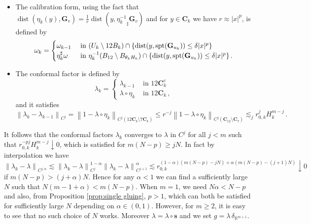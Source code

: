 \documentclass[reqno]{amsart}
\theoremstyle{definition}
\theoremstyle{remark}
\numberwithin{equation}{section}
\newcommand{\norm}[1]{\left\lVert#1\right\rVert}
\newcommand{\R}{\mathbb{R}}
\DeclareMathOperator{\dist}{dist}
\newcommand\res{\mathop{\hbox{\vrule height 7pt width .3pt depth 0pt\vrule height .3pt width 5pt depth 0pt}}\nolimits}
\newcommand{\bC}{\mathbf{C}} %
\newcommand{\bG}{\mathbf{G}} %
\def\a#1{\left\llbracket{#1}\right\rrbracket}
\begin{document}
\begin{itemize}
    \item The calibration form, using the fact that $\dist(\eta_k(y),\bG_v) = \frac{1}{r} \dist(y, {\eta_k^{-1}}_\sharp \bG_v)$ and for $y\in \bC_k$ we have $r\approx |x|^p$, is defined by
    \[\omega_k = \begin{cases}
        \omega_{k-1} &\text{ in } (U_k\setminus 12B_k)\cap \{ \dist(y,{\rm spt}(\bG_{u_k}))\le \delta |x|^p\}\\
        \eta_k^\sharp \omega &\text{ in }\eta_k^{-1}(B_{12}\setminus B_{\theta_kH_k}) \cap \{ \dist(y,{\rm spt}(\bG_{u_k}))\le \delta |x|^p\}\,.
    \end{cases}\]
    \item The conformal factor is defined by
    \[
    \lambda_k=
    \begin{cases}
    \lambda_{k-1} & \text{ in } 12\bC_k^c \\
    \lambda \circ \eta_k &\text{ in }12\bC_k\,, 
    \end{cases}
    \]
    and it satisfies 
    \[\norm{\lambda_k-\lambda_{k-1}}_{C^j} = \norm{1-\lambda\circ\eta_k}_{C^j(12\bC_k\setminus 7\bC_k)}\le r^{-j} \norm{1-\lambda\circ\eta_k}_{C^j(\bC_{12}\setminus \bC_{7})}\lesssim_j r_{0,k}^j H_k^{m-j}\,.\]
\end{itemize}

 It follows that the conformal factors $\lambda_k$ converges to $\lambda$ in $C^j$ for all $j<m$ such that $r_{0,k}^{-pj} H_k^{m-j} \downarrow 0$, which is satisfied for $m(N-p)\ge jN$. 
In fact by interpolation we have 
\[ \norm{\lambda_k - \lambda}_{C^{j,\alpha}} \lesssim \norm{\lambda_k-\lambda}_{C^j}^{1-\alpha} \norm{\lambda_k-\lambda}_{C^{j+1}}^{\alpha}\lesssim r_{0,k}^{(1-\alpha)(m(N-p)-jN)+\alpha(m(N-p)-(j+1)N)}\downarrow 0\]
if $m(N-p) > (j+\alpha)N$. Hence for any $\alpha<1$ we can find a sufficiently large $N$ such that $N(m-1 +\alpha)< m(N-p)$. When $m=1$, we need $N\alpha<N-p$ and also, from Proposition \ref{prop:single gluing}, $p>1$, which can both be satisfied for sufficiently large $N$ depending on $\alpha\in (0,1)$. However, for $m\geq 2$, it is easy to see that no such choice of $N$ works. Moreover $\lambda=\lambda \circ \boldsymbol{s}$ and we set $g=\lambda\,\delta_{\R^{m+1}}$.
\end{document}
